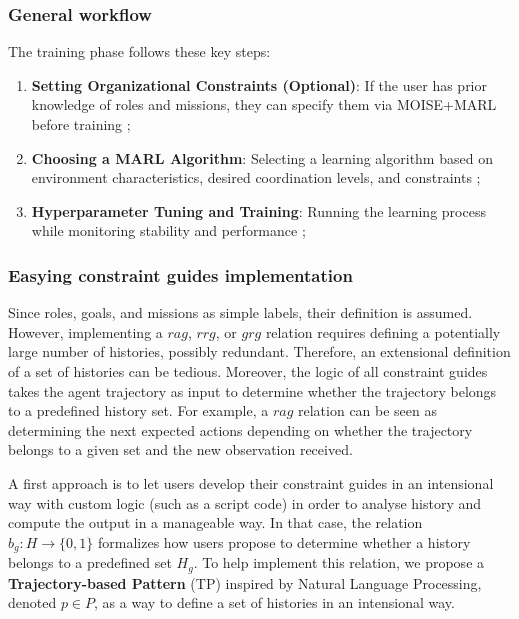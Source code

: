 \documentclass[pdflatex,sn-mathphys-num]{sn-jnl}%
\theoremstyle{thmstyleone}%
\theoremstyle{thmstyletwo}%
\theoremstyle{thmstylethree}%
\begin{document}
\subsubsection{General workflow}
The training phase follows these key steps:
\begin{enumerate}
    \item \textbf{Setting Organizational Constraints (Optional)}: If the user has prior knowledge of roles and missions, they can specify them via MOISE+MARL before training ;
    \item \textbf{Choosing a MARL Algorithm}: Selecting a learning algorithm based on environment characteristics, desired coordination levels, and constraints ;
    \item \textbf{Hyperparameter Tuning and Training}: Running the learning process while monitoring stability and performance ;
\end{enumerate}

\subsubsection{Easying constraint guides implementation}

Since roles, goals, and missions as simple labels, their definition is assumed. However, implementing a $rag$, $rrg$, or $grg$ relation requires defining a potentially large number of histories, possibly redundant. Therefore, an extensional definition of a set of histories can be tedious. Moreover, the logic of all constraint guides takes the agent trajectory as input to determine whether the trajectory belongs to a predefined history set. For example, a $rag$ relation can be seen as determining the next expected actions depending on whether the trajectory belongs to a given set and the new observation received.

A first approach is to let users develop their constraint guides in an intensional way with custom logic (such as a script code) in order to analyse history and compute the output in a manageable way. In that case, the relation $b_g: H \to \{0,1\}$ formalizes how users propose to determine whether a history belongs to a predefined set $H_g$.
To help implement this relation, we propose a \textbf{Trajectory-based Pattern} (TP) inspired by Natural Language Processing, denoted $p \in P$, as a way to define a set of histories in an intensional way.
\end{document}
